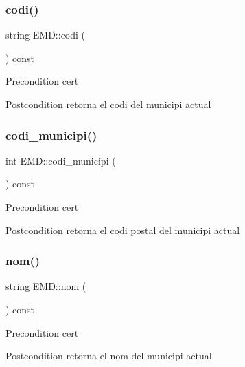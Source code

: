 \subsubsection{\texorpdfstring{codi()}{codi()}}
{\footnotesize\ttfamily string E\+M\+D\+::codi (\begin{DoxyParamCaption}{ }\end{DoxyParamCaption}) const}

\begin{DoxyPrecond}{Precondition}
cert 
\end{DoxyPrecond}
\begin{DoxyPostcond}{Postcondition}
retorna el codi del municipi actual 
\end{DoxyPostcond}
\mbox{\label{classEMD_afa3f267ffd6407f481e48fc5cfd4d577}} 
\subsubsection{\texorpdfstring{codi\+\_\+municipi()}{codi\_municipi()}}
{\footnotesize\ttfamily int E\+M\+D\+::codi\+\_\+municipi (\begin{DoxyParamCaption}{ }\end{DoxyParamCaption}) const}

\begin{DoxyPrecond}{Precondition}
cert 
\end{DoxyPrecond}
\begin{DoxyPostcond}{Postcondition}
retorna el codi postal del municipi actual 
\end{DoxyPostcond}
\mbox{\label{classEMD_a170411430493c144bb7eb00d7def4a51}} 
\subsubsection{\texorpdfstring{nom()}{nom()}}
{\footnotesize\ttfamily string E\+M\+D\+::nom (\begin{DoxyParamCaption}{ }\end{DoxyParamCaption}) const}

\begin{DoxyPrecond}{Precondition}
cert 
\end{DoxyPrecond}
\begin{DoxyPostcond}{Postcondition}
retorna el nom del municipi actual 
\end{DoxyPostcond}
\mbox{\label{classEMD_a73e84ad03c35f6374ce50320e4135d0c}} 
